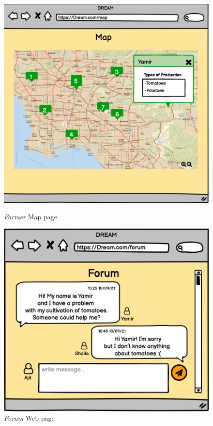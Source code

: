 \begin{figure}[H]
    \begin{minipage}{0.47\textwidth}
        \centering
        \includegraphics[width=1\textwidth]{mockups/FMap.png}
    \caption{\emph{Farmer } Map page}
    \label{fig:farmerMap}
    \end{minipage}\hfill
    \begin{minipage}{0.5\textwidth}
        \centering
        \includegraphics[width=1\textwidth]{mockups/Forum.png}
        \caption{\emph{Forum} Web page}
        \label{fig:forum}
    \end{minipage}
\end{figure}


